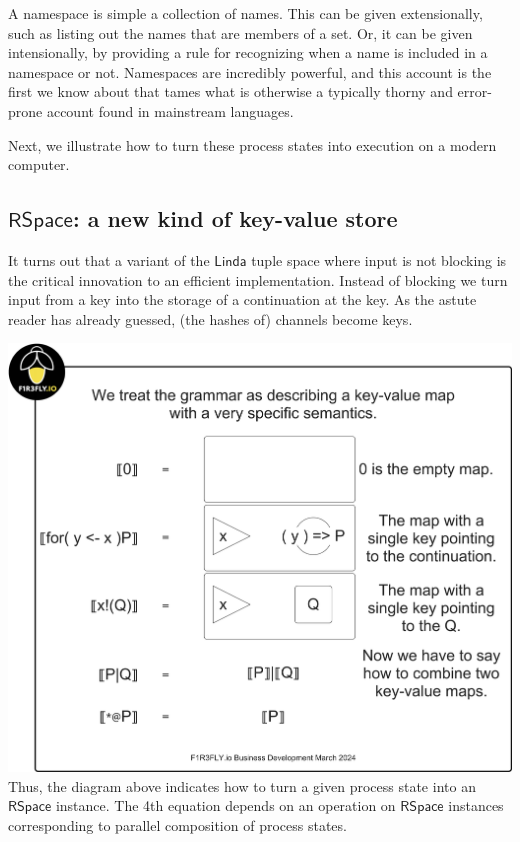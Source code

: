 \begin{remark}
  A namespace is simple a collection of names. This can be given
  extensionally, such as listing out the names that are members of a
  set. Or, it can be given intensionally, by providing a rule for
  recognizing when a name is included in a namespace or
  not. Namespaces are incredibly powerful, and this account is the
  first we know about that tames what is otherwise a typically thorny
  and error-prone account found in mainstream languages.
\end{remark}

Next, we illustrate how to turn these process states into execution on
a modern computer.

\subsection{$\mathsf{RSpace}$: a new kind of key-value store}

It turns out that a variant of the $\mathsf{Linda}$ tuple space where
input is not blocking is the critical innovation to an efficient
implementation. Instead of blocking we turn input from a key into the
storage of a continuation at the key. As the astute reader has already
guessed, (the hashes of) channels become keys.

\includegraphics[scale=0.25]{RHO20RSpaceSlide1.pdf} \\

Thus, the diagram above indicates how to turn a given process state
into an $\mathsf{RSpace}$ instance. The 4th equation depends on an
operation on $\mathsf{RSpace}$ instances corresponding to parallel
composition of process states. 

